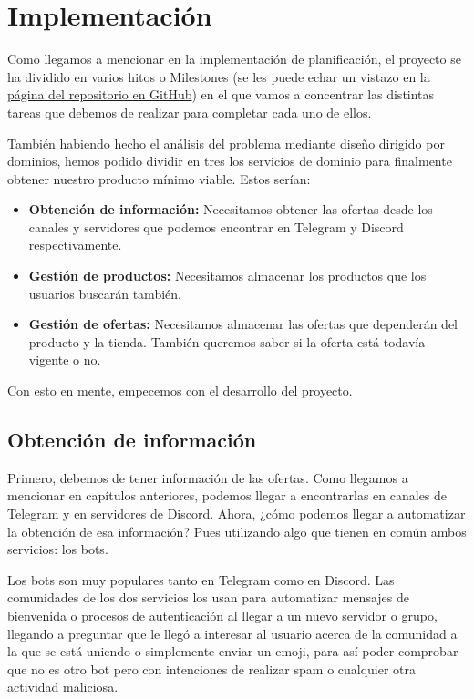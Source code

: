 \chapter{Implementación}

Como llegamos a mencionar en la implementación de planificación, el proyecto se ha 
dividido en varios hitos o Milestones (se les puede echar un vistazo en la 
\href{https://github.com/jero-dev/proyecto-tfg/milestones}{página del repositorio 
en GitHub}) en el que vamos a concentrar las distintas tareas que debemos de 
realizar para completar cada uno de ellos.

También habiendo hecho el análisis del problema mediante diseño dirigido por 
dominios, hemos podido dividir en tres los servicios de dominio para finalmente 
obtener nuestro producto mínimo viable. Estos serían:

\begin{itemize}
    \item \textbf{Obtención de información:} Necesitamos obtener las ofertas desde 
    los canales y servidores que podemos encontrar en Telegram y Discord 
    respectivamente.
    \item \textbf{Gestión de productos:} Necesitamos almacenar los productos que 
    los usuarios buscarán también.
    \item \textbf{Gestión de ofertas:} Necesitamos almacenar las ofertas que 
    dependerán del producto y la tienda. También queremos saber si la oferta está
    todavía vigente o no.
\end{itemize}

Con esto en mente, empecemos con el desarrollo del proyecto.

\section{Obtención de información}

Primero, debemos de tener información de las ofertas. Como llegamos a mencionar en 
capítulos anteriores, podemos llegar a encontrarlas en canales de Telegram y en 
servidores de Discord. Ahora, ¿cómo podemos llegar a automatizar la obtención de 
esa información? Pues utilizando algo que tienen en común ambos servicios: los bots.

Los bots son muy populares tanto en Telegram como en Discord. Las comunidades de 
los dos servicios los usan para automatizar mensajes de bienvenida o procesos de 
autenticación al llegar a un nuevo servidor o grupo, llegando a preguntar que le 
llegó a interesar al usuario acerca de la comunidad a la que se está uniendo o 
simplemente enviar un emoji, para así poder comprobar que no es otro bot pero con 
intenciones de realizar spam o cualquier otra actividad maliciosa.

